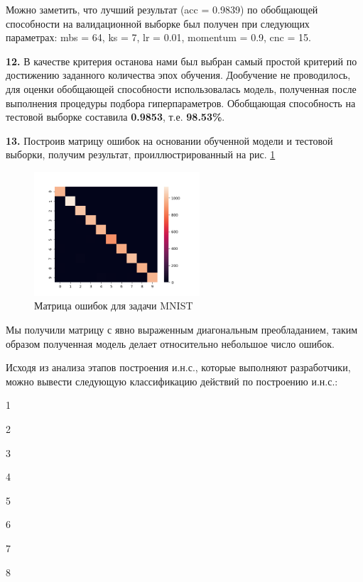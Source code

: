 				Можно заметить, что лучший результат (acc = 0.9839) по обобщающей способности на валидационной выборке был получен при следующих параметрах: mbs = 64, ks = 7, lr = 0.01, momentum = 0.9, cnc = 15.
				
				\textbf{12.} В качестве критерия останова нами был выбран самый простой критерий по достижению заданного количества эпох обучения. Дообучение не проводилось, для оценки обобщающей способности использовалась модель, полученная после выполнения процедуры подбора гиперпараметров. Обобщающая способность на тестовой выборке составила \textbf{0.9853}, т.е. \textbf{98.53\%}.
				
				\textbf{13.} Построив матрицу ошибок на основании обученной модели и тестовой выборки, получим результат, проиллюстрированный на рис. \ref{fig:conf_matrix_result}
				
				\begin{figure}[h]
					\centering
					\includegraphics[width=0.55\textwidth]{author/part3/figures/conf_matrix_result.png}
					\caption{Матрица ошибок для задачи MNIST}
					\label{fig:conf_matrix_result}
				\end{figure}
				
				Мы получили матрицу с явно выраженным диагональным преобладанием, таким образом полученная модель делает относительно небольшое число ошибок.
				
				Исходя из анализа этапов построения и.н.с., которые выполняют разработчики, можно вывести следующую классификацию действий по построению и.н.с.:
				
				1
				
				2
				
				3
				
				4
				
				5
				
				6
				
				7
				
				8
				
